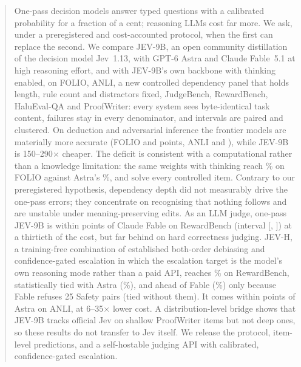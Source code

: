 \begin{abstract}
One-pass decision models answer typed questions with a calibrated probability for a fraction of a cent; reasoning LLMs cost far more.
We ask, under a preregistered and cost-accounted protocol, when the first can replace the second.
We compare JEV-9B, an open community distillation of the decision model Jev~1.13, with GPT-6 Astra and Claude Fable~5.1 at high reasoning effort, and with JEV-9B's own backbone with thinking enabled, on FOLIO, ANLI, a new controlled dependency panel that holds length, rule count and distractors fixed, JudgeBench, RewardBench, HaluEval-QA and ProofWriter: every system sees byte-identical task content, failures stay in every denominator, and intervals are paired and clustered.
On deduction and adversarial inference the frontier models are materially more accurate (FOLIO \DeltaFolioAstra{} and \DeltaFolioFable{} points, ANLI \DeltaAnliAstra{} and \DeltaAnliFable), while JEV-9B is 150--290$\times$ cheaper.
The deficit is consistent with a computational rather than a knowledge limitation: the same weights with thinking reach \AccFolioStwo\% on FOLIO against Astra's \AccFolioAstra\%, and solve every controlled item.
Contrary to our preregistered hypothesis, dependency depth did not measurably drive the one-pass errors; they concentrate on recognising that nothing follows and are unstable under meaning-preserving edits.
As an LLM judge, one-pass JEV-9B is within \AbsDeltaRbFable{} points of Claude Fable on RewardBench (interval [\LoRbFable, \HiRbFable]) at a thirtieth of the cost, but far behind on hard correctness judging.
JEV-H, a training-free combination of established both-order debiasing and confidence-gated escalation in which the escalation target is the model's own reasoning mode rather than a paid API, reaches \AccRbHarn\% on RewardBench, statistically tied with Astra (\AccRbAstra\%), and ahead of Fable (\AccRbFable\%) only because Fable refuses 25 Safety pairs (tied without them). It comes within \AbsDeltaHAnliAstra{} points of Astra on ANLI, at 6--35$\times$ lower cost.
A distribution-level bridge shows that JEV-9B tracks official Jev on shallow ProofWriter items but not deep ones, so these results do not transfer to Jev itself.
We release the protocol, item-level predictions, and a self-hostable judging API with calibrated, confidence-gated escalation.
\end{abstract}
